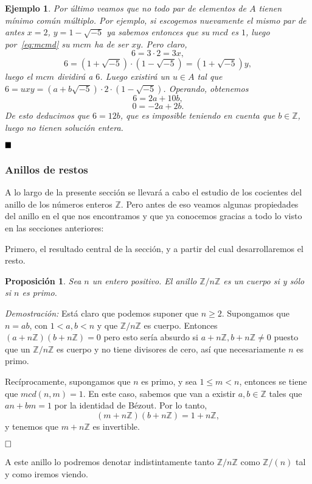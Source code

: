 \documentclass[12pt]{article}
\newtheorem{proposition}[theorem]{Proposición}
\newtheorem{example}{Ejemplo}[theorem]
\begin{document}
\begin{example}
Por último veamos que no todo par de elementos de $A$ tienen mínimo común múltiplo. Por ejemplo, si escogemos nuevamente el mismo par de antes $x = 2$, $y = 1- \sqrt{-5}$ ya sabemos entonces que su $mcd$ es $1$, luego por~\ref{eq:mcmd} su $mcm$ ha de ser $xy$. Pero claro, $$6 = 3 \cdot 2 = 3x, $$ $$6 = (1 + \sqrt{-5}) \cdot (1 - \sqrt{-5}) = (1 + \sqrt{-5})y,$$ luego el $mcm$ dividirá a $6$. Luego existirá un $u \in A$ tal que $6 = uxy = (a+ b\sqrt{-5}) \cdot 2 \cdot (1- \sqrt{-5})$. Operando, obtenemos $$6 = 2a + 10b,$$ $$0 = -2a + 2b.$$ De esto deducimos que $6 = 12b$, que es imposible teniendo en cuenta que $b \in \mathbb{Z}$, luego no tienen solución entera.

\end{example}
$\hfill \blacksquare$

\subsubsection{Anillos de restos}

A lo largo de la presente sección se llevará a cabo el estudio de los cocientes del anillo de los números enteros $\mathbb{Z}$. Pero antes de eso veamos algunas propiedades del anillo en el que nos encontramos y que ya conocemos gracias a todo lo visto en las secciones anteriores: 

Primero, el resultado central de la sección, y a partir del cual desarrollaremos el resto.

\begin{proposition}Sea $n$ un entero positivo. El anillo $\mathbb{Z}/n\mathbb{Z}$ es un cuerpo si y sólo si $n$ es primo.
\end{proposition}
\emph{Demostración: }Está claro que podemos suponer que $n \geq 2$. Supongamos que $n=ab$, con $1 <a,b<n$ y que $\mathbb{Z}/n\mathbb{Z}$ es cuerpo. Entonces $(a+n\mathbb{Z})(b+n\mathbb{Z}) = 0$ pero esto sería absurdo si $a+n\mathbb{Z},b+n\mathbb{Z}\neq 0$ puesto que un $\mathbb{Z}/n\mathbb{Z}$ es cuerpo y no tiene divisores de cero, así que necesariamente $n$ es primo.

Recíprocamente, supongamos que $n$ es primo, y sea $1 \leq m < n$, entonces se tiene que $mcd(n,m)=1$.  En este caso, sabemos que van a existir $a,b \in \mathbb{Z}$ tales que $an+bm = 1$ por la identidad de Bézout. Por lo tanto, $$(m+n\mathbb{Z})(b+n\mathbb{Z}) = 1+n\mathbb{Z},$$ y tenemos que $m+n\mathbb{Z}$ es invertible.

$\hfill \square$

A este anillo lo podremos denotar indistintamente tanto $\mathbb{Z}/n\mathbb{Z}$ como $\mathbb{Z}/(n)$ tal y como iremos viendo.
\end{document}
